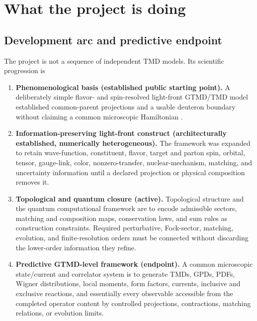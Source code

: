 \documentclass[11pt,oneside]{book}
\begin{document}
\chapter{What the project is doing}
\label{chap:scope}

\section{Development arc and predictive endpoint}

The project is not a sequence of independent TMD models.  Its scientific progression is
\begin{enumerate}[label=\textbf{Stage \arabic*:}]
 \item \textbf{Phenomenological basis (established public starting point).}  A deliberately simple flavor- and spin-resolved light-front GTMD/TMD model established common-parent projections and a usable deuteron boundary without claiming a common microscopic Hamiltonian \cite{DeuteronWignerRepo2026,DWGTMDTechnicalDraft2026}.
 \item \textbf{Information-preserving light-front construct (architecturally established, numerically heterogeneous).}  The framework was expanded to retain wave-function, constituent, flavor, target and parton spin, orbital, tensor, gauge-link, color, nonzero-transfer, nuclear-mechanism, matching, and uncertainty information until a declared projection or physical composition removes it.
 \item \textbf{Topological and quantum closure (active).}  Topological structure and the quantum computational framework are to encode admissible sectors, matching and composition maps, conservation laws, and sum rules as construction constraints.  Required perturbative, Fock-sector, matching, evolution, and finite-resolution orders must be connected without discarding the lower-order information they refine.
 \item \textbf{Predictive GTMD-level framework (endpoint).}  A common microscopic state/current and correlator system is to generate TMDs, GPDs, PDFs, Wigner distributions, local moments, form factors, currents, inclusive and exclusive reactions, and essentially every observable accessible from the completed operator content by controlled projections, contractions, matching relations, or evolution limits.
\end{enumerate}
\end{document}
